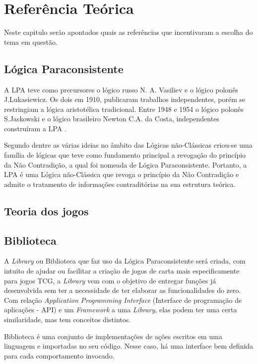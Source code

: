 
\chapter{Referência Teórica}

Neste capitulo serão apontados quais as referências que incentivaram a escolha do tema em questão.

\section{Lógica Paraconsistente}

A LPA teve como precursores o lógico russo N. A. Vasiliev e o lógico polonês J.Lukasiewicz. Os dois em 1910, publicaram trabalhos independentes, porém se restringiam a lógica aristotélica tradicional. Entre 1948 e 1954 o lógico polonês S.Jaskowski e o lógico brasileiro Newton C.A. da Costa, independentes construíram a LPA \cite[p. 27]{tomda-decisao-lpa-2011}.

Segundo  dentre as várias ideias no âmbito das Lógicas não-Clássicas criou-se uma família de lógicas que teve como fundamento principal a  revogação do princípio da Não Contradição, a qual foi nomeada de Lógica Paraconsistente. Portanto, a LPA é uma Lógica não-Clássica que
revoga o princípio da Não Contradição e admite o tratamento de informações
contraditórias na sua estrutura teórica.

\section{Teoria dos jogos}

\section{Biblioteca}

A \textit{Library} ou Biblioteca que faz uso da Lógica Paraconsistente será criada, com intuito de ajudar ou facilitar a criação de jogos de carta mais especificamente para jogos TCG, a \textit{Library} vem com o objetivo de entregar funções já desenvolvida sem ter a necessidade de ter elaborar as funcionalidades do zero.
Com relação \textit{Application Programming Interface} (Interface de programação de aplicações - API) e um \textit{Framework} a uma \textit{Library}, elas podem ter uma
certa similaridade, mas tem conceitos distintos.

Biblioteca é uma conjunto de implementações de ações escritos em uma linguagem e importadas no seu código. Nesse caso, há uma interface bem definida para cada comportamento invocado.

